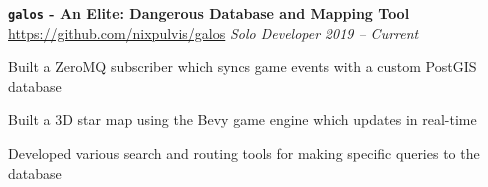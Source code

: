 \item
\headerrow
{\textbf{\texttt{galos} - An Elite: Dangerous Database and Mapping Tool}}
{\url{https://github.com/nixpulvis/galos}}
\headerrow
{\emph{Solo Developer}}
{\emph{2019 -- Current}}
\begin{itemize*}
    \item Built a ZeroMQ subscriber which syncs game events with a custom
        PostGIS database
    \item Built a 3D star map using the Bevy game engine which updates in
        real-time
    \item Developed various search and routing tools for making specific
        queries to the database
\end{itemize*}

